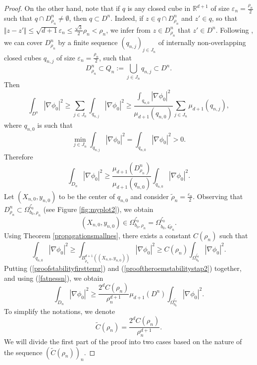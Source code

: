 \documentclass[11pt]{article}
\begin{document}
\begin{proof}
	On the other hand, note that if $q$ is any closed cube in ${\mathbb R}^{d+1}$ of size $\varepsilon_n= \frac{\rho _n}{2}$ such that $q\cap D^n_{\rho _n}\ne\emptyset$, then 
	$q\subset D^n$. Indeed, if $z\in q\cap D^n_{\rho _n}$ and $z'\in q$,  so that  $\Vert z-z'\Vert \le \sqrt{d+1}\varepsilon _n \le \frac{\sqrt{3}}{2}\rho _n <\rho _n $, we infer from
	$z\in  D^n_{\rho _n}$ that  $z'\in D^n$. 
	Following \cite{alessandrini2000optimal}, we can cover $D^n_{\rho_n}$ by a finite sequence $(q_{n,j})_{j\in J_n}$ of internally non-overlapping closed cubes $q_{n,j}$
	of size $\varepsilon_n=\frac{\rho_n}{2}$, such that 
    \begin{equation}\label{non-overlapping}
        D^n_{\rho_n}\subset Q_n := \bigcup_{j\in J_n}  q_{n,j}\subset D^n.
    \end{equation}
	   Then 
	$$\displaystyle\int_{D^n}|\nabla\phi_0|^2\geq \displaystyle\sum_{j\in J_n}\displaystyle\int_{q_{n,j}}|\nabla\phi_0|^2\geq \frac{\displaystyle\int_{q_{n,0}}|\nabla\phi_0|^2}{\mu_{d+1} (q_{n,0})}\displaystyle\sum_{j\in J_n}\mu_{d+1} (q_{n,j}),$$
	where $q_{n,0}$ is such that 
	$$\min_{j\in J_n}\displaystyle\int_{q_{n,j}}|\nabla\phi_0|^2=\displaystyle\int_{q_{n,0}}|\nabla\phi_0|^2>0.$$
	Therefore
	\begin{equation}\label{proofstabilityfirsttemr}
		\displaystyle\int_{D_n}|\nabla\phi_0|^2\geq \frac{\mu_{d+1} (D^n_{\rho_n})}{\mu_{d+1} (q_{n,0})}\displaystyle\int_{q_{n,0}}|\nabla\phi_0|^2.
	\end{equation}
	Let $(X_{n,0},y_{n,0})$ to be the center of $q_{n,0}$ and consider $\widetilde{\rho}_n=\frac{\varepsilon_n}{2}.$ Observing that 
	$D^n_{\rho_n}\subset \Omega_{b_0,\rho_n}^{\zeta_0}$ (see Figure \ref{fig:myplot2}), we obtain 
	$$(X_{n,0},y_{n,0})\in \Omega_{b_0,\rho_n}^{\zeta_0}=\Omega_{b_0,4\widetilde{\rho}_n}^{\zeta_0}.$$
	Using  Theorem  \ref{propagationsmallnes},  there exists a constant $C(\rho_n)$ such that 
	\begin{equation}\label{prooftheroemstabilitystap2}
		\displaystyle\int_{q_{n,0}}|\nabla\phi_0|^2\geq\displaystyle\int_{B_{\widetilde{\rho}_n}^{d+1}((X_{n,0},y_{n,0}))}|\nabla\phi_0|^2\geq C(\rho_n)\displaystyle\int_{\Omega_{b_0}^{\zeta_0}}|\nabla\phi_0|^2.
	\end{equation}
	Putting  (\ref{proofstabilityfirsttemr}) and (\ref{prooftheroemstabilitystap2}) together, and using (\ref{fatnessn}), we obtain 
	\begin{equation}\label{upperforeachdomain}
		\displaystyle\int_{D_n}|\nabla\phi_0|^2 \geq\frac{2^d C(\rho_n)}{\rho_n^{d+1}}\mu_{d+1} (D^n)\displaystyle\int_{\Omega_{b_0}^{\zeta_0}}|\nabla\phi_0|^2.
	\end{equation}
	To simplify the notations, we denote
	$$\widetilde{C}(\rho_n)=\frac{2^dC(\rho_n)}{\rho_n^{d+1}}.$$
	We will divide the first part of the proof into two cases based on the nature of the sequence  $\left(\widetilde{C}(\rho_n)\right)_n.$
    

\end{proof}
\end{document}
